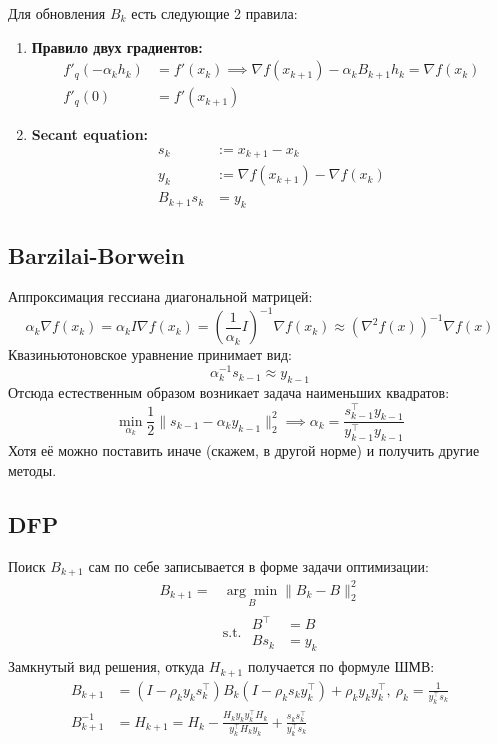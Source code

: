 \documentclass[11pt,a4paper]{report}
\theoremstyle{definition}
\theoremstyle{definition}
\theoremstyle{definition}
\begin{document}
	Для обновления $ B_k $ есть следующие 2 правила:
	\begin{enumerate}
		\item \textbf{Правило двух градиентов:} 
			\begin{align*}
				f'_{q}(-\alpha_k h_k) &= f'(x_k) \implies \nabla f(x_{k+1}) - \alpha_k B_{k+1} h_k = \nabla f(x_k) \\
				f'_{q}(0) &= f'(x_{k+1})
			\end{align*}
		\item \textbf{Secant equation:}
		\begin{align*}
			s_{k} &:= x_{k+1} - x_{k}\\
			y_{k} &:= \nabla f(x_{k+1}) - \nabla f(x_k)\\
			B_{k+1} s_k &= y_k
		\end{align*}
	\end{enumerate}
	\subsection{Barzilai-Borwein}
	Аппроксимация гессиана диагональной матрицей:
	$$
		\alpha_k \nabla f(x_k) = \alpha_k I \nabla f(x_k) = \left ( \frac{1}{\alpha_k} I \right )^{-1} \nabla f(x_k) \approx (\nabla^2 f(x))^{-1} \nabla f(x)
	$$
	Квазиньютоновское уравнение принимает вид:
	$$
		\alpha_k^{-1} s_{k-1} \approx y_{k-1}
	$$
	Отсюда естественным образом возникает задача наименьших квадратов:
	$$
		\min_{\alpha_k} \frac{1}{2} \| s_{k-1} - \alpha_{k} y_{k-1} \|_2^2 \implies \alpha_k = \frac{s_{k-1}^{\top} y_{k-1}}{y_{k-1}^{\top} y_{k-1}}
	$$
	Хотя её можно поставить иначе (скажем, в другой норме) и получить другие методы.
	\subsection{DFP}
	Поиск $ B_{k+1} $ сам по себе записывается в форме задачи оптимизации:
	\begin{align*}
		B_{k+1} = &\underset{B}{\arg\min} \| B_k - B \|_2^2\\
							&\text{s.t. } 
							\begin{aligned} 
								B^{\top} &= B\\ 
								B s_k &= y_k
							\end{aligned}
	\end{align*}
	Замкнутый вид решения, откуда $ H_{k+1} $ получается по формуле ШМВ:
	\begin{align*}
		B_{k+1} &= (I - \rho_k y_k s_k^\top) B_k (I - \rho_k s_k y_k^{\top}) + \rho_k y_k y_k^{\top},\ \rho_k = \frac{1}{y_k^\top s_k}\\
		B_{k+1}^{-1} &= H_{k+1} = H_k - \frac{H_k y_k y_k^{\top} H_k}{y_k^\top H_k y_k} + \frac{s_k s_k^\top}{y_k^\top s_k}
	\end{align*}
\end{document}

